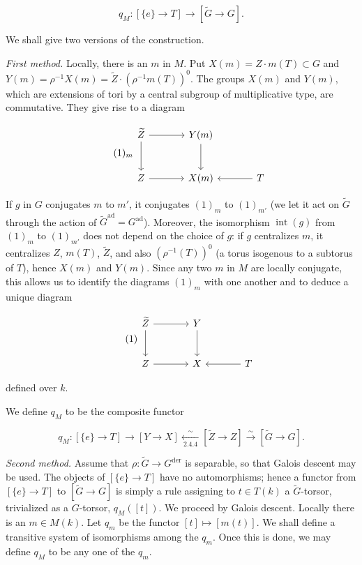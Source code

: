 \documentclass[10pt,a4paper]{article}
\begin{document}
\[
q_M:[\{e\}\longrightarrow T]\longrightarrow[\widetilde G\longrightarrow G].
\]

We shall give two versions of the construction.

\emph{First method.} Locally, there is an \(m\) in \(M\). Put \(X(m)=Z\cdot m(T)\subset G\) and \(Y(m)=\rho^{-1}X(m)=\widetilde Z\cdot(\rho^{-1}m(T))^0\). The groups \(X(m)\) and \(Y(m)\), which are extensions of tori by a central subgroup of multiplicative type, are commutative. They give rise to a diagram

\[
\tag*{\((1)_m\)}
\begin{tikzcd}[column sep=large,row sep=large]
\widetilde Z \arrow[r] \arrow[d] & Y(m) \arrow[d] \\
Z \arrow[r] & X(m) & T \arrow[l]
\end{tikzcd}
\]

If \(g\) in \(G\) conjugates \(m\) to \(m'\), it conjugates \((1)_m\) to \((1)_{m'}\) (we let it act on \(\widetilde G\) through the action of \(\widetilde G^{\mathrm{ad}}=G^{\mathrm{ad}}\)). Moreover, the isomorphism \(\operatorname{int}(g)\) from \((1)_m\) to \((1)_{m'}\) does not depend on the choice of \(g\): if \(g\) centralizes \(m\), it centralizes \(Z\), \(m(T)\), \(\widetilde Z\), and also \((\rho^{-1}(T))^0\) (a torus isogenous to a subtorus of \(T\)), hence \(X(m)\) and \(Y(m)\). Since any two \(m\) in \(M\) are locally conjugate, this allows us to identify the diagrams \((1)_m\) with one another and to deduce a unique diagram

\[
\tag{1}
\begin{tikzcd}[column sep=large,row sep=large]
\widetilde Z \arrow[r] \arrow[d] & Y \arrow[d] \\
Z \arrow[r] & X & T \arrow[l]
\end{tikzcd}
\]

defined over \(k\).

We define \(q_M\) to be the composite functor

\[
q_M:[\{e\}\longrightarrow T]\longrightarrow[Y\longrightarrow X]
\xleftarrow[\ 2.4.4\ ]{\sim}[\widetilde Z\longrightarrow Z]
\xrightarrow{\sim}[\widetilde G\longrightarrow G].
\]

\emph{Second method.} Assume that \(\rho:\widetilde G\to G^{\mathrm{der}}\) is separable, so that Galois descent may be used. The objects of \([\{e\}\to T]\) have no automorphisms; hence a functor from \([\{e\}\to T]\) to \([\widetilde G\to G]\) is simply a rule assigning to \(t\in T(k)\) a \(\widetilde G\)-torsor, trivialized as a \(G\)-torsor, \(q_M([t])\). We proceed by Galois descent. Locally there is an \(m\in M(k)\). Let \(q_m\) be the functor \([t]\mapsto[m(t)]\). We shall define a transitive system of isomorphisms among the \(q_m\). Once this is done, we may define \(q_M\) to be any one of the \(q_m\).
\end{document}

